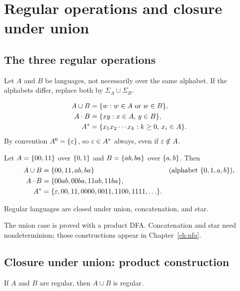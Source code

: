 \section{Regular operations and closure under union}

\subsection{The three regular operations}
Let $A$ and $B$ be languages, not necessarily over the same alphabet. If the
alphabets differ, replace both by $\Sigma_A\cup\Sigma_B$.

\begin{definition}
\[
\begin{aligned}
  A\cup B
    &=\{w:w\in A\text{ or }w\in B\},\\
  A\mathbin{\cdot} B
    &=\{xy:x\in A,\, y\in B\},\\
  A^*
    &=\{x_1x_2\cdots x_k:k\geq 0,\, x_i\in A\}.
\end{aligned}
\]
By convention $A^0=\{\varepsilon\}$, so $\varepsilon\in A^*$ always, even if
$\varepsilon\notin A$.
\end{definition}

\begin{example}
Let $A=\{00,11\}$ over $\{0,1\}$ and $B=\{ab,ba\}$ over $\{a,b\}$. Then
\[
\begin{aligned}
  A\cup B
    &=\{00,11,ab,ba\}
    &&\text{(alphabet }\{0,1,a,b\}\text{),}\\
  A\mathbin{\cdot} B
    &=\{00ab,00ba,11ab,11ba\},\\
  A^*
    &=\{\varepsilon,00,11,0000,0011,1100,1111,\ldots\}.
\end{aligned}
\]
\end{example}

\begin{theorem}
Regular languages are closed under union, concatenation, and star.
\end{theorem}
The union case is proved with a product DFA. Concatenation and star need
nondeterminism; those constructions appear in Chapter~\ref{ch:nfa}.

\subsection{Closure under union: product construction}
\begin{theorem}
If $A$ and $B$ are regular, then $A\cup B$ is regular.
\end{theorem}

